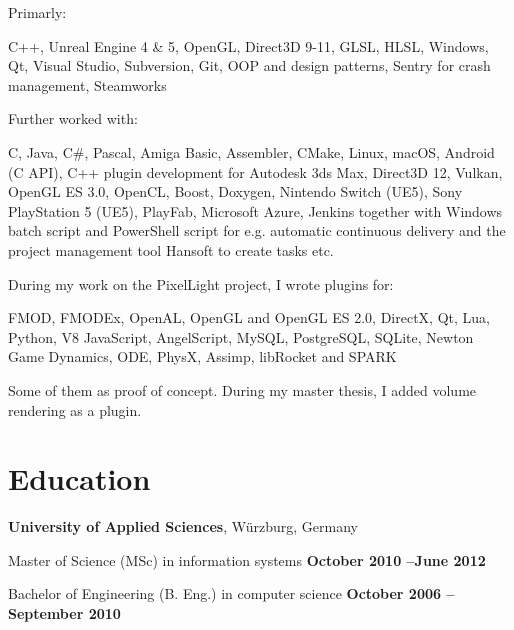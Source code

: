 \documentclass[margin,line]{Ofenberg_Resume}
\begin{document}
\begin{resume}
	Primarly:
	\begin{list2}
		\item C++, Unreal Engine 4 \& 5, OpenGL, Direct3D 9-11, GLSL, HLSL, Windows, Qt, Visual Studio, Subversion, Git, OOP and design patterns, Sentry for crash management, Steamworks
	\end{list2}\vspace{-1.5mm}

	Further worked with:
	\begin{list2}
		\item C, Java, C\#, Pascal, Amiga Basic, Assembler, CMake, Linux, macOS, Android (C API), C++ plugin development for Autodesk 3ds Max, Direct3D 12, Vulkan, OpenGL ES 3.0, OpenCL, Boost, Doxygen, Nintendo Switch (UE5), Sony PlayStation 5 (UE5), PlayFab, Microsoft Azure, Jenkins together with Windows batch script and PowerShell script for e.g. automatic continuous delivery and the project management tool Hansoft to create tasks etc.
	\end{list2}\vspace{-1.5mm}

	During my work on the PixelLight project, I wrote plugins for:
	\begin{list2}
		\item FMOD, FMODEx, OpenAL, OpenGL and OpenGL ES 2.0, DirectX,
		Qt, Lua, Python, V8 JavaScript, AngelScript, MySQL, PostgreSQL, SQLite, Newton Game Dynamics, ODE, PhysX, Assimp, libRocket and SPARK
	\end{list2}\vspace{-1.5mm}
	Some of them as proof of concept. During my master thesis, I added volume rendering as a plugin.


	\section{\mysidestyle Education}
	\textbf{University of Applied Sciences}, W\"urzburg, Germany
	\begin{list2}
		\item Master of Science (MSc) in information systems \hfill \textbf{October 2010 --June 2012}\vspace{-3mm}\\\vspace{-1mm}%
		\item Bachelor of Engineering (B. Eng.) in computer science \hfill \textbf{October 2006 -- September 2010}\vspace{-3mm}\\\vspace{-1mm}%
	\end{list2}\vspace{-1.5mm}



\end{resume}
\end{document}

